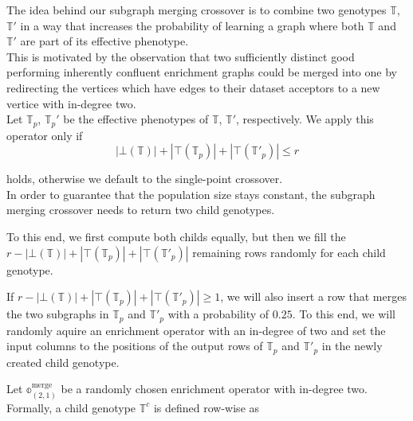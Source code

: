 The idea behind our subgraph merging crossover is to combine two genotypes $\mathbb{T}$, $\mathbb{T}'$ in a way that increases the probability of learning a graph where both $\mathbb{T}$ and $\mathbb{T}'$ are part of its effective phenotype.\\

This is motivated by the observation that two sufficiently distinct good performing inherently confluent enrichment graphs could be merged into one by redirecting the vertices which have edges to their dataset acceptors to a new vertice with in-degree two.\\

Let $\mathbb{T}_p$, $\mathbb{T}_p'$ be the effective phenotypes of $\mathbb{T}$, $\mathbb{T}'$, respectively.
We apply this operator only if
\begin{equation*}
  |\bot(\mathbb{T})| + |\top(\mathbb{T}_p)| + |\top(\mathbb{T}'_p)| \leq r
\end{equation*}

holds, otherwise we default to the single-point crossover.\\

In order to guarantee that the population size stays constant, the subgraph merging crossover needs to return two child genotypes.

To this end, we first compute both childs equally, but then we fill the $r-|\bot(\mathbb{T})| + |\top(\mathbb{T}_p)| + |\top(\mathbb{T}'_p)|$ remaining rows randomly for each child genotype.


If $r-|\bot(\mathbb{T})| + |\top(\mathbb{T}_p)| + |\top(\mathbb{T}'_p)|\geq 1$, we will also insert a row that merges the two subgraphs in $\mathbb{T}_p$ and $\mathbb{T}'_p$ with a probability of $0.25$.
To this end, we will randomly aquire an enrichment operator with an in-degree of two and set the input columns to the positions of the output rows of $\mathbb{T}_p$ and $\mathbb{T}'_p$ in the newly created child genotype.

Let $\mathbb{o}^{\text{merge}}_{(2,1)}$ be a randomly chosen enrichment operator with in-degree two.
Formally, a child genotype $\mathbb{T}^c$ is defined row-wise as

